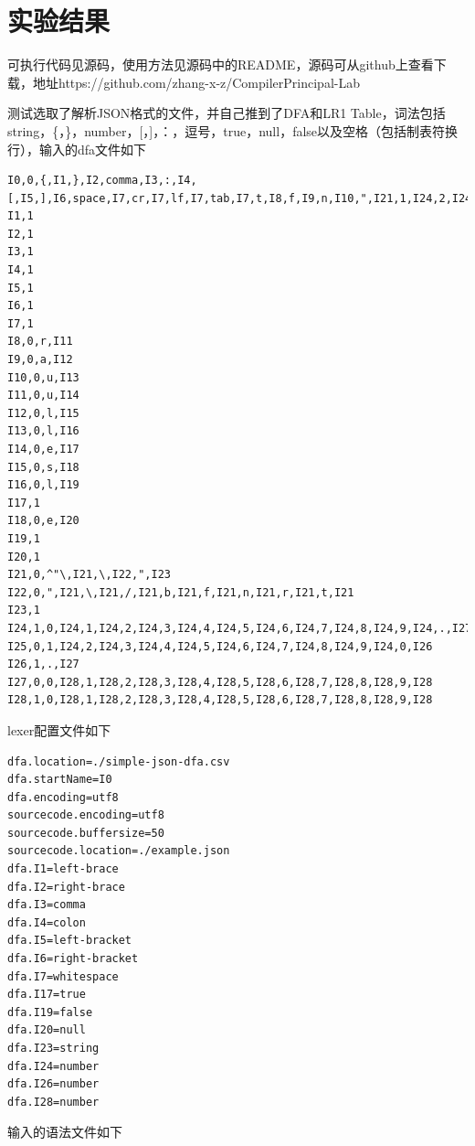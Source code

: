 \section{实验结果}
可执行代码见源码，使用方法见源码中的README，源码可从github上查看下载，地址https://github.com/zhang-x-z/CompilerPrincipal-Lab


测试选取了解析JSON格式的文件，并自己推到了DFA和LR1 Table，词法包括string，\{，\}，number，[，]，：，逗号，true，null，false以及空格（包括制表符换行），输入的dfa文件如下
\begin{lstlisting}
I0,0,{,I1,},I2,comma,I3,:,I4,[,I5,],I6,space,I7,cr,I7,lf,I7,tab,I7,t,I8,f,I9,n,I10,",I21,1,I24,2,I24,3,I24,4,I24,5,I24,6,I24,7,I24,8,I24,9,I24,-,I25,0,I26
I1,1
I2,1
I3,1
I4,1
I5,1
I6,1
I7,1
I8,0,r,I11
I9,0,a,I12
I10,0,u,I13
I11,0,u,I14
I12,0,l,I15
I13,0,l,I16
I14,0,e,I17
I15,0,s,I18
I16,0,l,I19
I17,1
I18,0,e,I20
I19,1
I20,1
I21,0,^"\,I21,\,I22,",I23
I22,0,",I21,\,I21,/,I21,b,I21,f,I21,n,I21,r,I21,t,I21
I23,1
I24,1,0,I24,1,I24,2,I24,3,I24,4,I24,5,I24,6,I24,7,I24,8,I24,9,I24,.,I27
I25,0,1,I24,2,I24,3,I24,4,I24,5,I24,6,I24,7,I24,8,I24,9,I24,0,I26
I26,1,.,I27
I27,0,0,I28,1,I28,2,I28,3,I28,4,I28,5,I28,6,I28,7,I28,8,I28,9,I28
I28,1,0,I28,1,I28,2,I28,3,I28,4,I28,5,I28,6,I28,7,I28,8,I28,9,I28
\end{lstlisting}
lexer配置文件如下
\begin{lstlisting}
dfa.location=./simple-json-dfa.csv
dfa.startName=I0
dfa.encoding=utf8
sourcecode.encoding=utf8
sourcecode.buffersize=50
sourcecode.location=./example.json
dfa.I1=left-brace
dfa.I2=right-brace
dfa.I3=comma
dfa.I4=colon
dfa.I5=left-bracket
dfa.I6=right-bracket
dfa.I7=whitespace
dfa.I17=true
dfa.I19=false
dfa.I20=null
dfa.I23=string
dfa.I24=number
dfa.I26=number
dfa.I28=number
\end{lstlisting}
输入的语法文件如下
